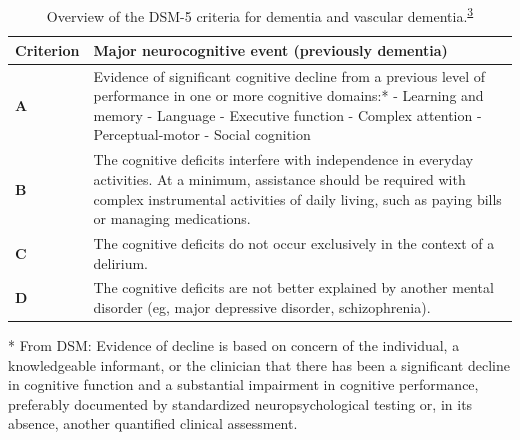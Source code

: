 \documentclass[a4paper, twoside]{templates/ociamthesis}
\begin{document}
~





\begin{table}[H]

\caption[Overview of the DSM-5 criteria for dementia and vascular dementia.]{\label{tab:diagnosticCriteria-table}Overview of the DSM-5 criteria for dementia and vascular dementia.\textsuperscript{\protect\hyperlink{ref-edition2013}{3}}}
\centering
\begin{threeparttable}
\begin{tabular}[t]{>{\centering\arraybackslash}p{5em}>{\raggedright\arraybackslash}p{27em}}
\toprule
\textbf{Criterion} & \textbf{Major neurocognitive event (previously dementia)}\\
\midrule
\textbf{A} & Evidence of significant cognitive decline from a previous level of performance in one or more cognitive domains:* \newline - Learning and memory \newline - Language \newline - Executive function \newline - Complex attention \newline - Perceptual-motor \newline - Social cognition \newline\\
\midrule
\textbf{B} & The cognitive deficits interfere with independence in everyday activities. At a minimum, assistance should be required with complex instrumental activities of daily living, such as paying bills or managing medications. \newline\\
\midrule
\textbf{C} & The cognitive deficits do not occur exclusively in the context of a delirium. \newline\\
\midrule
\textbf{D} & The cognitive deficits are not better explained by another mental disorder (eg, major depressive disorder, schizophrenia). \newline\\
\bottomrule
\end{tabular}
\begin{tablenotes}
\item[*] From DSM: Evidence of decline is based on concern of the individual, a knowledgeable informant, or the clinician that there has been a significant decline in cognitive function and a substantial impairment in cognitive performance, preferably documented by standardized neuropsychological testing or, in its absence, another quantified clinical assessment.
\end{tablenotes}
\end{threeparttable}
\end{table}
\end{document}
